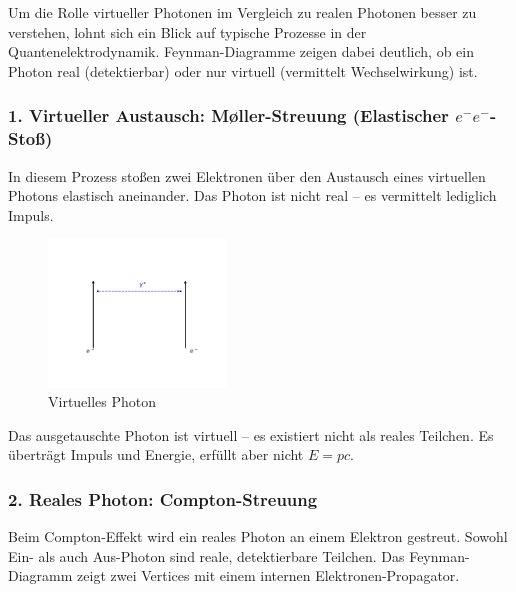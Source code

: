 Um die Rolle virtueller Photonen im Vergleich zu realen Photonen besser zu verstehen, lohnt sich ein Blick auf typische Prozesse in der Quantenelektrodynamik. Feynman-Diagramme zeigen dabei deutlich, ob ein Photon real (detektierbar) oder nur virtuell (vermittelt Wechselwirkung) ist.

\subsubsection*{1. Virtueller Austausch: Møller-Streuung (Elastischer $e^-e^-$-Stoß)}
In diesem Prozess stoßen zwei Elektronen über den Austausch eines virtuellen Photons elastisch aneinander. Das Photon ist nicht real – es vermittelt lediglich Impuls.
\begin{figure}[H]
	\begin{center}
		\includegraphics[width=0.42\textwidth]{bilder/moeller-diagramm.pdf}
	\end{center}
	\caption{Virtuelles Photon}
\end{figure}


\begin{tcolorbox}[physikbox, title=Virtuelles Photon]
	\label{box:virtuelles Photon}
	Das ausgetauschte Photon ist virtuell – es existiert nicht als reales Teilchen. Es überträgt Impuls und Energie, erfüllt aber nicht $E = pc$.
\end{tcolorbox}
\subsubsection*{2. Reales Photon: Compton-Streuung}
Beim Compton-Effekt wird ein reales Photon an einem Elektron gestreut. Sowohl Ein- als auch Aus-Photon sind reale, detektierbare Teilchen. Das Feynman-Diagramm zeigt zwei Vertices mit einem internen Elektronen-Propagator.

